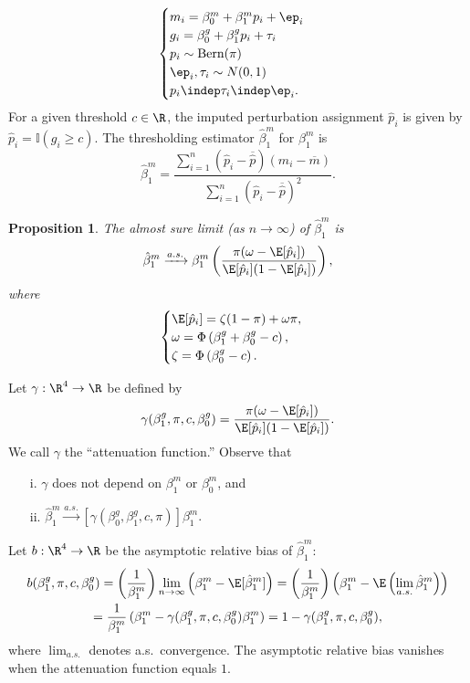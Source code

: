 \documentclass[12pt]{article}
\newtheorem{proposition}{Proposition}
\begin{document}
\begin{equation}\label{theoretical_model}
\begin{cases}
m_i = \beta^m_0 + \beta^m_1 p_i + \ep_i \\
g_i = \beta^g_0 + \beta^g_1 p_i + \tau_i \\
p_i \sim \textrm{Bern}(\pi) \\
\ep_i, \tau_i \sim N(0,1) \\
p_i \indep \tau_i \indep \ep_i.
\end{cases}
\end{equation}
For a given threshold $c \in \R$, the imputed perturbation assignment $\hat{p}_i$ is given by $\hat{p}_i = \mathbb{I}(g_i \geq c).$ The thresholding estimator $\hat{\beta}^m_1$ for $\beta^m_1$ is $$\hat{\beta}^m_1 = \frac{\sum_{i=1}^n (\hat{p}_i - \overline{\hat{p}}) (m_i - \overline{m})}{\sum_{i=1}^n (\hat{p}_i - \overline{\hat{p}})^2 }.$$

\begin{proposition}\label{prop:convergence}
 The almost sure limit (as $n \to \infty$) of $\hat{\beta}^m_1$ is
\begin{equation}\label{thresh_est_intercepts}
\hat{\beta}^m_1 \xrightarrow{a.s.} \beta^m_1 \left(\frac{ \pi( \omega - \E[ \hat{p}_i ])}{ \E[\hat{p}_i] (1 - \E[\hat{p}_i])}\right),
\end{equation}
where
$$\begin{cases}
\E[\hat{p}_i] = \zeta(1-\pi) + \omega\pi , \\
\omega = \Phi\left(\beta_1^g + \beta_0^g -c \right) ,\\ \zeta = \Phi\left( \beta^g_0 - c \right). \\
\end{cases}$$
\end{proposition}
Let $\gamma: \R^4 \to \R$ be defined by
$$ \gamma(\beta^g_1, \pi, c, \beta^g_0) = \frac{\pi (\omega - \E[\hat{p}_i])}{\E[\hat{p}_i] (1 - \E[\hat{p}_i]) }.$$ We call $\gamma$ the ``attenuation function.'' Observe that \begin{itemize}
\item[i.] $\gamma$ does not depend on $\beta^m_1$ or $\beta^m_0$, and
\item[ii.] $\hat{\beta}^m_1 \xrightarrow{a.s.} [\gamma(\beta_0^g, \beta_1^g, c, \pi)] \beta^m_1.$
\end{itemize}
Let $b: \R^4 \to \R$ be the asymptotic relative bias of $\hat{\beta}^m_1$:
\begin{multline*}
b(\beta^g_1, \pi, c, \beta^g_0) = \left(\frac{1}{\beta^m_1}\right) \lim_{n\to\infty} \left(\beta^m_1 - \E[\hat{\beta}^m_1]\right) = \left( \frac{1}{\beta^m_1}\right)\left(\beta^m_1 - \E \left(\lim_{a.s.} \hat{\beta}^m_1 \right)\right) \\ = \frac{1}{\beta^m_1} \left(\beta^m_1 - \gamma(\beta^g_1, \pi, c, \beta^g_0)\beta^m_1\right) = 1 - \gamma(\beta^g_1, \pi, c, \beta^g_0),
\end{multline*}
where $\lim_{a.s.}$ denotes a.s.\ convergence. The asymptotic relative bias vanishes when the attenuation function equals $1$.
\end{document}
